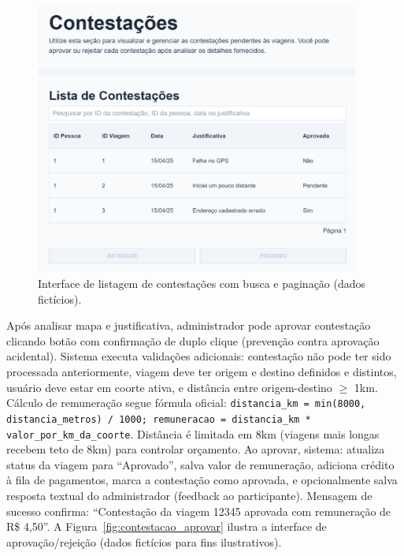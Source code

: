  \begin{figure}[H]
   \centering
   \includegraphics[width=0.95\textwidth]{figuras/contestacoes_listar.png}
   \caption{Interface de listagem de contestações com busca e paginação (dados fictícios).}
   \label{fig:contestacoes_listagem}
 \end{figure}



Após analisar mapa e justificativa, administrador pode aprovar contestação clicando botão com confirmação de duplo clique (prevenção contra aprovação acidental). Sistema executa validações adicionais: contestação não pode ter sido processada anteriormente, viagem deve ter origem e destino definidos e distintos, usuário deve estar em coorte ativa, e distância entre origem-destino $\geq$ 1km. Cálculo de remuneração segue fórmula oficial: \texttt{distancia\_km = min(8000, distancia\_metros) / 1000; remuneracao = distancia\_km * valor\_por\_km\_da\_coorte}. Distância é limitada em 8km (viagens mais longas recebem teto de 8km) para controlar orçamento. Ao aprovar, sistema: atualiza status da viagem para ``Aprovado'', salva valor de remuneração, adiciona crédito à fila de pagamentos, marca a contestação como aprovada, e opcionalmente salva resposta textual do administrador (feedback ao participante). Mensagem de sucesso confirma: ``Contestação da viagem 12345 aprovada com remuneração de R\$ 4,50''. A Figura~\ref{fig:contestacao_aprovar} ilustra a interface de aprovação/rejeição (dados fictícios para fins ilustrativos).

